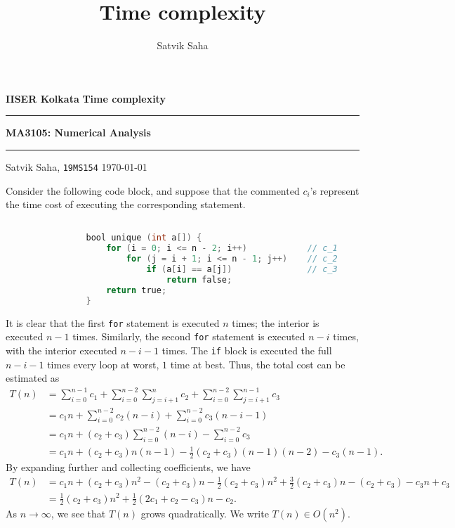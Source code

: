 \documentclass[10pt]{article}
\title{Time complexity}
\author{Satvik Saha}
\date{}
\begin{document}
    \noindent\textbf{IISER Kolkata} \hfill \textbf{Time complexity}
    \vspace{3pt}
    \hrule
    \vspace{3pt}
    \begin{center}
    \LARGE{\textbf{MA3105: Numerical Analysis}}
    \end{center}
    \vspace{3pt}
    \hrule
    \vspace{3pt}
    Satvik Saha, \texttt{19MS154} \hfill \today
    \vspace{20pt}

    Consider the following code block, and suppose that the commented $c_i$'s
    represent the time cost of executing the corresponding statement.
    
    \begin{minipage}{\linewidth}  
    \begin{lstlisting}[language=C, numbers=none]

                bool unique (int a[]) {
                    for (i = 0; i <= n - 2; i++)            // c_1
                        for (j = i + 1; i <= n - 1; j++)    // c_2
                            if (a[i] == a[j])               // c_3
                                return false;
                    return true;
                }
    \end{lstlisting}
    \end{minipage}

    It is clear that the first \texttt{for} statement is executed $n$ times;
    the interior is executed $n - 1$ times. Similarly, the second \texttt{for}
    statement is executed $n - i$ times, with the interior executed $n - i - 1$
    times. The \texttt{if} block is executed the full $n - i - 1$ times every loop at
    worst, $1$ time at best. Thus, the total cost can be estimated as 
    \begin{align*}
        T(n) &= \sum_{i = 0}^{n - 1} c_1 + \sum_{i = 0}^{n - 2}\sum_{j = i + 1}^{n}
        c_2 + \sum_{i = 0}^{n - 2}\sum_{j = i + 1}^{n - 1} c_3 \\
        &= c_1n + \sum_{i = 0}^{n - 2} c_2(n - i) + \sum_{i = 0}^{n - 2} c_3(n - i -
        1) \\
        &= c_1n + (c_2 + c_3) \sum_{i = 0}^{n - 2} (n - i) - \sum_{i = 0}^{n - 2} c_3
        \\
        &= c_1n + (c_2 + c_3)n(n - 1) - \frac{1}{2}(c_2 + c_3)(n - 1)(n - 2) - c_3(n
        - 1).
    \end{align*}
    By expanding further and collecting coefficients, we have
    \begin{align*}
        T(n) &= c_1n + (c_2 + c_3)n^2 - (c_2 + c_3)n - \frac{1}{2}(c_2 + c_3)n^2 +
        \frac{3}{2}(c_2 + c_3)n - (c_2 + c_3) - c_3n + c_3 \\
        &= \frac{1}{2}(c_2 + c_3)n^2 + \frac{1}{2}(2c_1 + c_2 - c_3)n - c_2.
    \end{align*}
    As $n \to \infty$, we see that $T(n)$ grows quadratically. We write $T(n) \in
    O(n^2)$.
\end{document}
